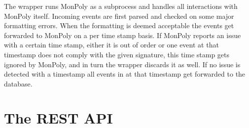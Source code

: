 The wrapper runs MonPoly as a subprocess and handles all interactions with MonPoly itself.
Incoming events are first parsed and checked on some major formatting errors.
When the formatting is deemed acceptable the events get forwarded to MonPoly on a per time stamp basis.
If MonPoly reports an issue with a certain time stamp, either it is out of order or one event at that timestamp does not comply with the given signature, this time stamp gets ignored by MonPoly, and in turn the wrapper discards it as well.
If no issue is detected with a timestamp all events in at that timestamp get forwarded to the database.

\section{The REST API}


% 



